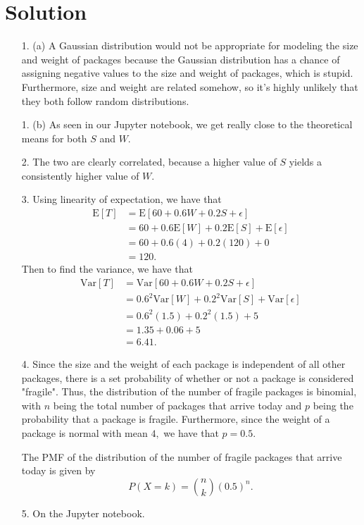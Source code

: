 \documentclass{../harvardml}
\theoremstyle{definition}
\theoremstyle{plain}
\newenvironment{solution}
  {\color{blue}\section*{Solution}}
{}
\begin{document}
\begin{solution}
	\begin{itemize}
        \item[1. (a)] A Gaussian distribution would not be appropriate for modeling the size and weight of packages because the Gaussian distribution has a chance of assigning negative values to the size and weight of packages, which is stupid. Furthermore, size and weight are related somehow, so it's highly unlikely that they both follow random distributions.
        \item[1. (b)] As seen in our Jupyter notebook, we get really close to the theoretical means for both $S$ and $W.$
        \item[2.] The two are clearly correlated, because a higher value of $S$ yields a consistently higher value of $W.$ 
        \item[3.] Using linearity of expectation, we have that 
        \begin{align*}
        \textrm{E}[T] &= \textrm{E}[60 + 0.6W + 0.2S + \epsilon] \\
        & = 60 + 0.6\textrm{E}[W] + 0.2\textrm{E}[S] + \textrm{E}[\epsilon] \\
        &= 60 + 0.6(4) + 0.2(120) + 0 \\
        &= 120.
        \end{align*}
        Then to find the variance, we have that 
        \begin{align*}
        \textrm{Var}[T] &= \textrm{Var}[60 + 0.6W + 0.2S + \epsilon] \\
        &= 0.6^2\textrm{Var}[W] + 0.2^2\textrm{Var}[S] + \textrm{Var}[\epsilon] \\
        &= 0.6^2(1.5) + 0.2^2(1.5) + 5 \\
        &= 1.35 + 0.06 + 5 \\
        &= 6.41.
        \end{align*}
        \item[4.] Since the size and the weight of each package is independent of all other packages, there is a set probability of whether or not a package is considered "fragile". Thus, the distribution of the number of fragile packages is binomial, with $n$ being the total number of packages that arrive today and $p$ being the probability that a package is fragile. Furthermore, since the weight of a package is normal with mean $4,$ we have that $p = 0.5.$ \par
        The PMF of the distribution of the number of fragile packages that arrive today is given by
        $$P(X = k) = \binom{n}{k}(0.5)^n.$$
        \item[5.] On the Jupyter notebook.
    \end{itemize}

\end{solution} 
\end{document}
